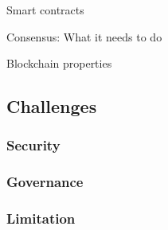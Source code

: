 \begin{frame}{Smart contracts}

\end{frame}

\begin{frame}{Consensus: What it needs to do}

\end{frame}

\begin{frame}{Blockchain properties}

\end{frame}

\subsection{Challenges}

\subsubsection{Security}
\subsubsection{Governance}
\subsubsection{Limitation}